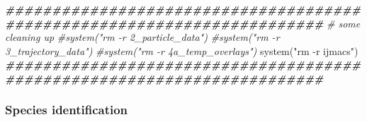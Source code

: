 \documentclass[
]{article}
\newenvironment{Shaded}{\begin{snugshade}}{\end{snugshade}}
\newcommand{\CommentTok}[1]{\textcolor[rgb]{0.56,0.35,0.01}{\textit{#1}}}
\newcommand{\DocumentationTok}[1]{\textcolor[rgb]{0.56,0.35,0.01}{\textbf{\textit{#1}}}}
\newcommand{\FunctionTok}[1]{\textcolor[rgb]{0.00,0.00,0.00}{#1}}
\newcommand{\NormalTok}[1]{#1}
\newcommand{\StringTok}[1]{\textcolor[rgb]{0.31,0.60,0.02}{#1}}
\begin{document}
\begin{Shaded}
\begin{Highlighting}[]
\DocumentationTok{\#\#\#\#\#\#\#\#\#\#\#\#\#\#\#\#\#\#\#\#\#\#\#\#\#\#\#\#\#\#\#\#\#\#\#\#\#\#\#\#\#\#\#\#\#\#\#\#\#\#\#\#\#\#\#\#\#\#\#\#\#\#\#\#\#\#\#\#\#\#\#\#}
\CommentTok{\# some cleaning up}
\CommentTok{\#system("rm {-}r 2\_particle\_data")}
\CommentTok{\#system("rm {-}r 3\_trajectory\_data")}
\CommentTok{\#system("rm {-}r 4a\_temp\_overlays")}
\FunctionTok{system}\NormalTok{(}\StringTok{"rm {-}r ijmacs"}\NormalTok{)}
\DocumentationTok{\#\#\#\#\#\#\#\#\#\#\#\#\#\#\#\#\#\#\#\#\#\#\#\#\#\#\#\#\#\#\#\#\#\#\#\#\#\#\#\#\#\#\#\#\#\#\#\#\#\#\#\#\#\#\#\#\#\#\#\#\#\#\#\#\#\#\#\#\#\#\#\#}
\end{Highlighting}
\end{Shaded}

\hypertarget{species-identification}{%
\subsubsection{Species identification}\label{species-identification}}
\end{document}
